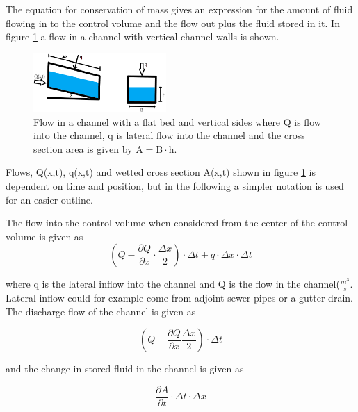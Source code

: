 The equation for conservation of mass gives an expression for the amount of fluid flowing in to the control volume and the flow out plus the fluid stored in it.
In figure \ref{fig:firkant_kloak} a flow in a channel with vertical channel walls is shown.

\begin{figure}[H]
\centering
\includegraphics[width=0.45\textwidth]{report/modeling/pictures/firkant_kloak.png}
\caption{Flow in a channel with a flat bed and vertical sides where Q is flow into the channel, q is lateral flow into the channel and the cross section area is given by $\text{A} = \text{B} \cdot \text{h}$. }
\label{fig:firkant_kloak}
\end{figure}

Flows, Q(x,t), q(x,t) and wetted cross section A(x,t) shown in figure \ref{fig:firkant_kloak} is dependent on time and position, but in the following a simpler notation is used for an easier outline. 

The flow into the control volume when considered from the center of the control volume is given as
\begin{equation}
	\left(Q - \frac{\partial Q}{\partial x}\cdot \frac{\Delta x}{2}\right) \cdot \Delta t + q \cdot \Delta x \cdot \Delta t
\label{flowin_saintbernard}
\end{equation}

where q is the lateral inflow into the channel and Q is the flow in the channel($\frac{m^3}{s}$. Lateral inflow could for example come from adjoint sewer pipes or a gutter drain.
The discharge flow of the channel is given as

\begin{equation}
\left(Q + \frac{\partial Q}{ \partial x} \frac{\Delta x}{2} \right) \cdot \Delta t 
\label{flowout_saintbernard}
\end{equation}

and the change in stored fluid in the channel is given as

\begin{equation}
\frac{\partial A}{\partial t}\cdot \Delta t \cdot \Delta x	
\label{stored_saintbernard}
\end{equation}

